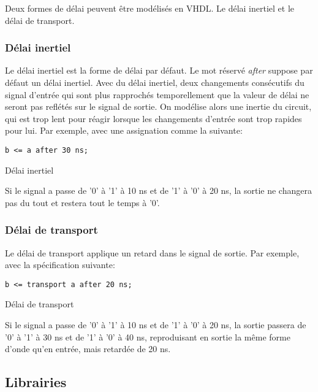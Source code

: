 \documentclass[11pt]{article}
\begin{document}
Deux formes de délai peuvent être modélisés en VHDL. Le délai inertiel
et le délai de transport.

\subsubsection{Délai inertiel}
\label{sec:org8960101}

Le délai inertiel est la forme de délai par défaut. Le mot réservé
\emph{after} suppose par défaut un délai inertiel. Avec du délai inertiel,
deux changements consécutifs du signal d'entrée qui sont plus
rapprochés temporellement que la valeur de délai ne seront pas
reflétés sur le signal de sortie. On modélise alors une inertie du
circuit, qui est trop lent pour réagir lorsque les changements
d'entrée sont trop rapides pour lui. Par exemple, avec une
assignation comme la suivante:

\begin{listing}[htbp]
\begin{verbatim}
b <= a after 30 ns;
\end{verbatim}
\caption{Délai inertiel}
\end{listing}

Si le signal a passe de '0' à '1' à 10 ns et de '1' à '0' à 20 ns, la
sortie ne changera pas du tout et restera tout le temps à '0'.

\subsubsection{Délai de transport}
\label{sec:org03677c2}

Le délai de transport applique un retard dans le signal de sortie. Par
exemple, avec la spécification suivante:

\begin{listing}[htbp]
\begin{verbatim}
b <= transport a after 20 ns;
\end{verbatim}
\caption{Délai de transport}
\end{listing}
Si le signal a passe de '0' à '1' à 10 ns et de '1' à '0' à 20 ns, la
sortie passera de '0' à '1' à 30 ns et de '1' à '0' à 40 ns,
reproduisant en sortie la même forme d'onde qu'en entrée, mais
retardée de 20 ns.

\subsection{Librairies}
\label{sec:org7c887fa}
\end{document}
